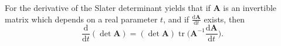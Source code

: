 For the derivative of the Slater determinant yields that if $\mathbf A$ is an invertible matrix which depends on a real parameter $t$, and if $\frac{\mathrm d\mathbf A}{\mathrm dt}$ exists, then 
$$
\frac{\mathrm d}{\mathrm dt}(\det\mathbf A)=(\det\mathbf A)\mathop{\textrm{tr}}\biggl(\mathbf A^{-1}\frac{\mathrm d\mathbf A}{\mathrm dt}\biggr).
$$




